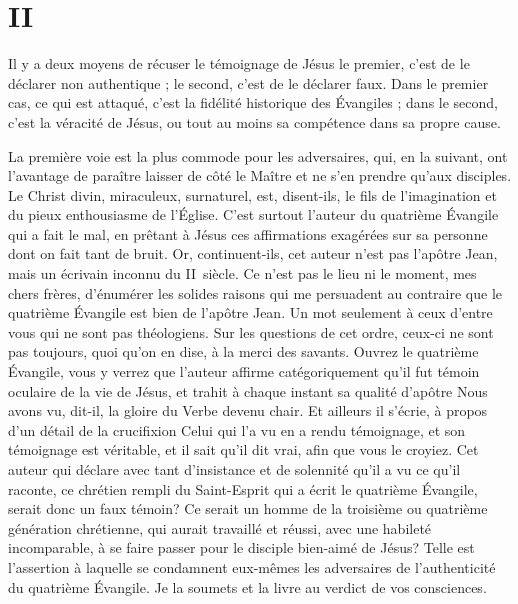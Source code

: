 \section{II}

Il y a deux moyens de récuser le témoignage de Jésus\frcolon{} le premier, c’est de le déclarer non authentique ; le second, c’est de le déclarer faux. Dans le premier cas, ce qui est attaqué, c’est la fidélité historique des Évangiles ; dans le second, c’est la véracité de Jésus, ou tout au moins sa compétence dans sa propre cause.

La première voie est la plus commode pour les adversaires, qui, en la suivant, ont l’avantage de paraître laisser de côté le Maître et ne s’en prendre qu’aux disciples.
Le Christ divin, miraculeux, surnaturel, est, disent-ils, le fils de l’imagination et du pieux enthousiasme de l’Église.
C’est surtout l’auteur du quatrième Évangile qui a fait le mal, en prêtant à Jésus ces affirmations exagérées sur sa personne dont on fait tant de bruit.
Or, continuent-ils, cet auteur n’est pas l’apôtre Jean, mais un écrivain inconnu du II~siècle. Ce n’est pas le lieu ni le moment, mes chers frères, d’énumérer les solides raisons qui me persuadent au contraire que le quatrième Évangile est bien de l’apôtre Jean.
Un mot seulement à ceux d’entre vous qui ne sont pas théologiens. Sur les questions de cet ordre, ceux-ci ne sont pas toujours, quoi qu’on en dise, à la merci des savants. Ouvrez le quatrième Évangile, vous y verrez que l’auteur affirme catégoriquement qu’il fut témoin oculaire de la vie de Jésus, et trahit à chaque instant sa qualité d’apôtre\frcolon{}
\Og{} Nous avons vu, dit-il, la gloire du Verbe devenu chair.\Fg{}
Et ailleurs il s’écrie, à propos d’un détail de la crucifixion\frcolon{}
\Og{} Celui qui l’a vu en a rendu témoignage, et son témoignage est véritable, et il sait qu’il dit vrai, afin que vous le croyiez.\Fg{}
Cet auteur qui déclare avec tant d’insistance et de solennité qu’il a vu ce qu’il raconte, ce chrétien rempli du Saint-Esprit qui a écrit le quatrième Évangile, serait donc un faux témoin?
Ce serait un homme de la troisième ou quatrième génération chrétienne, qui aurait travaillé et réussi, avec une habileté incomparable,
à se faire passer pour le disciple bien-aimé de Jésus? Telle est l’assertion à laquelle se condamnent eux-mêmes les adversaires
de l’authenticité du quatrième Évangile.
Je la soumets et la livre au verdict de vos consciences.

